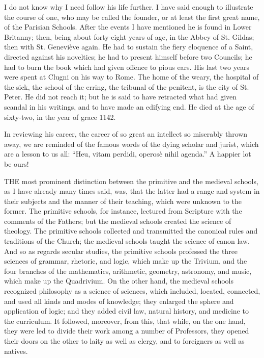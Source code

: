 I do not know why I need
follow his life further. I have said enough to illustrate the course
of one, who may be called the founder, or at least the first great
name, of the Parisian Schools. After the events I have mentioned he is
found in Lower Britanny; then, being about forty-eight years of age,
in the Abbey of St. Gildas; then with St. Geneviève again. He had to
sustain the fiery eloquence of a Saint, directed against his
novelties; he had to present himself before two Councils; he had to
burn the book which had given offence to pious ears. His last two
years were spent at Clugni on his way to Rome. The home of the weary,
the hospital of the sick, the school of the erring, the tribunal of
the penitent, is the city of St. Peter. He did not reach it; but he is
said to have retracted what had given scandal in his writings, and to
have made an edifying end. He died at the age of sixty-two, in the
year of grace 1142.

In reviewing his career, the
career of so great an intellect so miserably thrown away, we are
reminded of the famous words of the dying scholar and jurist, which
are a lesson to us all: ``Heu, vitam perdidi, operosè nihil
agenda.'' A happier lot be ours!


THE
most prominent distinction between the primitive and the medieval
schools, as I have already many times said, was, that the latter had a
range and system in their subjects and the manner of their teaching,
which were unknown to the former. The primitive schools, for instance,
lectured from Scripture with the comments of the Fathers; but the
medieval schools created the science of theology. The primitive
schools collected and transmitted the canonical rules and traditions
of the Church; the medieval schools taught the science of canon law.
And so as regards secular studies, the primitive schools professed the
three sciences of grammar, rhetoric, and logic, which make up the
Trivium, and the four branches of the mathematics, arithmetic,
geometry, astronomy, and music, which make up the Quadrivium. On the
other hand, the medieval schools recognized philosophy as a science of
sciences, which included, located, connected, and used all kinds and
modes of knowledge; they enlarged the sphere and application of logic;
and they added civil law, natural history, and medicine to the
curriculum. It followed, moreover, from this, that while, on the one
hand, they were led to divide their work among a number of Professors,
they opened their doors on the other to laity as well as clergy, and
to foreigners as well as natives.

